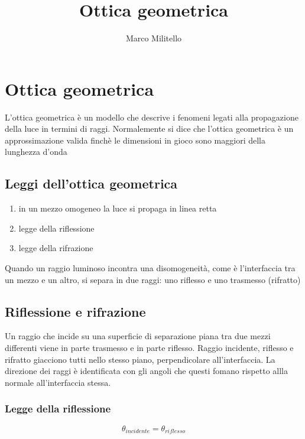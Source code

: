 \documentclass[a4paper,11pt]{report}
\begin{document}
	\date{}
	\author{Marco Militello}
	\title{Ottica geometrica}
	\maketitle
	\tableofcontents
	\newpage

\chapter{Ottica geometrica}

L'ottica geometrica è un modello che descrive i fenomeni legati alla propagazione della luce in termini di raggi.
Normalemente si dice che l'ottica geometrica è un approssimazione valida finchè le dimensioni in gioco sono maggiori della lunghezza d'onda

\section{Leggi dell'ottica geometrica}

\begin{enumerate}
    \item in un mezzo omogeneo la luce si propaga in linea retta
    \item legge della riflessione
    \item legge della rifrazione
\end{enumerate}
Quando un raggio luminoso incontra una disomogeneità, come è l'interfaccia tra un mezzo e un altro, si separa in due raggi: uno riflesso e uno trasmesso (rifratto)

\section{Riflessione e rifrazione}

Un raggio che incide su una superficie di separazione piana tra due mezzi differenti viene in parte trasmesso e in parte riflesso.
Raggio incidente, riflesso e rifratto giacciono tutti nello stesso piano, perpendicolare all'interfaccia.
La direzione dei raggi è identificata con gli angoli che questi fomano rispetto allla normale all'interfaccia stessa.

\subsection*{Legge della riflessione}

\begin{equation*}
    \theta_{incidente} = \theta_{riflesso}
\end{equation*}
\end{document}
